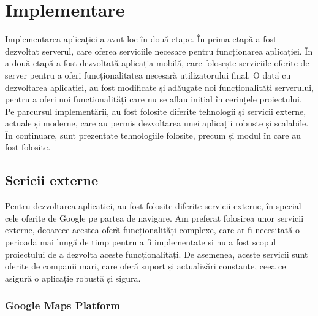 \chapter{Implementare}

Implementarea aplicației a avut loc în două etape. În prima etapă a fost dezvoltat serverul, care oferea serviciile necesare pentru funcționarea aplicației. În a două etapă a fost dezvoltată aplicația mobilă, care folosește serviciile oferite de server pentru a oferi funcționalitatea necesară utilizatorului final. O dată cu dezvoltarea aplicației, au fost modificate și adăugate noi funcționalități serverului, pentru a oferi noi funcționalități care nu se aflau inițial în cerințele proiectului.
Pe parcursul implementării, au fost folosite diferite tehnologii și servicii externe, actuale și moderne, care au permis dezvoltarea unei aplicații robuste și scalabile. În continuare, sunt prezentate tehnologiile folosite, precum și modul în care au fost folosite.

\section{Sericii externe}

Pentru dezvoltarea aplicației, au fost folosite diferite servicii externe, în special cele oferite de Google pe partea de navigare. Am preferat folosirea unor servicii externe, deoarece acestea oferă funcționalități complexe, care ar fi necesitată o perioadă mai lungă de timp pentru a fi implementate si nu a fost scopul proiectului de a dezvolta aceste funcționalități. De asemenea, aceste servicii sunt oferite de companii mari, care oferă suport și actualizări constante, ceea ce asigură o aplicație robustă și sigură.

\newpage

\subsection{Google Maps Platform}

